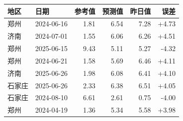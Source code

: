 \begin{tabular}{llrrrr}
\toprule
地区 & 日期 & 参考值 & 预测值 & 昨日值 & 误差 \\
\midrule
郑州 & 2024-06-16 & 1.81 & 6.54 & 7.28 & +4.73 \\
济南 & 2024-07-01 & 1.55 & 6.06 & 6.26 & +4.51 \\
郑州 & 2025-06-15 & 9.43 & 5.11 & 5.27 & -4.32 \\
郑州 & 2024-06-21 & 1.58 & 5.69 & 6.46 & +4.11 \\
济南 & 2025-06-26 & 1.98 & 6.08 & 6.41 & +4.10 \\
石家庄 & 2025-06-26 & 2.33 & 6.38 & 6.51 & +4.05 \\
石家庄 & 2024-08-10 & 6.61 & 2.61 & 0.75 & -4.00 \\
郑州 & 2024-04-19 & 1.36 & 5.34 & 5.58 & +3.98 \\
\bottomrule
\end{tabular}